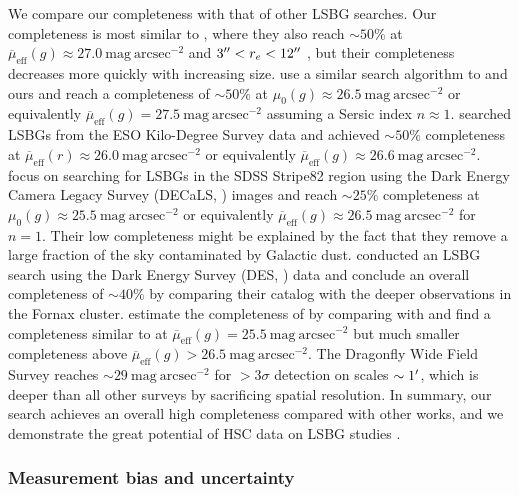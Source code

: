 \documentclass[twocolumn,astrosymb,twocolappendix]{aastex631}
\newcommand{\sbunit}{\mathrm{mag\ arcsec}^{-2}}
\newcommand{\sbeff}{\overline{\mu}_{\mathrm{eff}}(g)}
\newcommand{\sbeffr}{\overline{\mu}_{\mathrm{eff}}(r)}
\begin{document}
\begin{CJK*}{UTF8}{gbsn}
We compare our completeness with that of other LSBG searches. Our completeness is most similar to , where they also reach $\sim 50\%$ at $\sbeff \approx 27.0\ \sbunit$ and $3\mbox{$^{\prime\prime}$} < r_e < 12\mbox{$^{\prime\prime}$}$ \citep{Kado-Fong2021,Greene2022}, but their completeness decreases more quickly with increasing size. \citet{CarlstenELVES2022} use a similar search algorithm to  and ours and reach a completeness of $\sim 50\%$ at $\mu_0(g)\approx 26.5\ \sbunit$ or equivalently $\sbeff = 27.5\ \sbunit$ assuming a Sersic index $n \approx 1$. \citet{vdBurg2017} searched LSBGs from the ESO Kilo-Degree Survey data and achieved $\sim 50\%$ completeness at $\sbeffr\approx 26.0\ \sbunit$ or equivalently $\sbeff \approx 26.6\ \sbunit$. \citet{Zaritsky2021} focus on searching for LSBGs in the SDSS Stripe82 region using the Dark Energy Camera Legacy Survey (DECaLS, \citealt{Dey2019}) images and reach $\sim 25\%$ completeness at $\mu_{0}(g) \approx 25.5\ \sbunit$ or equivalently $\sbeff \approx 26.5\ \sbunit$ for $n=1$. Their low completeness might be explained by the fact that they remove a large fraction of the sky contaminated by Galactic dust. \citet{Tanoglidis2021} conducted an LSBG search using the Dark Energy Survey (DES, \citealt{Abbot2018}) data and conclude an overall completeness of $\sim 40\%$ by comparing their catalog with the deeper observations in the Fornax cluster. \citet{Kado-Fong2021} estimate the completeness of \citet{Tanoglidis2021} by comparing with  and find a completeness similar to  at $\sbeff = 25.5\ \sbunit$ but much smaller completeness above $\sbeff > 26.5\ \sbunit$. The Dragonfly Wide Field Survey \citep{Danieli2020} reaches $\sim 29\ \sbunit$ for $>3\sigma$ detection on scales $\sim 1\mbox{$^\prime$}$, which is deeper than all other surveys by sacrificing spatial resolution. In summary, our search achieves an overall high completeness compared with other works, and we demonstrate the great potential of HSC data on LSBG studies \citep[e.g.,][]{Huang2018,Kado-Fong2018}. 

\subsubsection{Measurement bias and uncertainty}\label{sec:meas_unc}


\end{CJK*}
\end{document}
